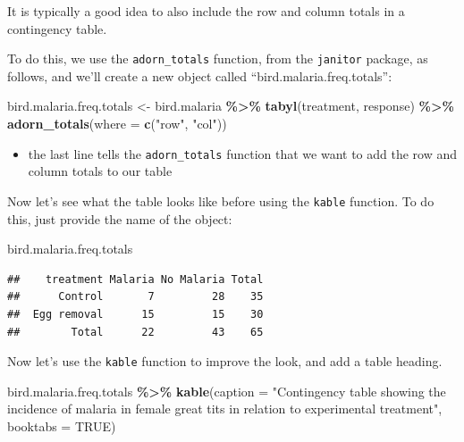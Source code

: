 \documentclass[
]{book}
\newenvironment{Shaded}{\begin{snugshade}}{\end{snugshade}}
\newcommand{\AttributeTok}[1]{\textcolor[rgb]{0.13,0.29,0.53}{#1}}
\newcommand{\ConstantTok}[1]{\textcolor[rgb]{0.56,0.35,0.01}{#1}}
\newcommand{\FunctionTok}[1]{\textcolor[rgb]{0.13,0.29,0.53}{\textbf{#1}}}
\newcommand{\NormalTok}[1]{#1}
\newcommand{\OtherTok}[1]{\textcolor[rgb]{0.56,0.35,0.01}{#1}}
\newcommand{\SpecialCharTok}[1]{\textcolor[rgb]{0.81,0.36,0.00}{\textbf{#1}}}
\newcommand{\StringTok}[1]{\textcolor[rgb]{0.31,0.60,0.02}{#1}}
\providecommand{\tightlist}{%
  \setlength{\itemsep}{0pt}\setlength{\parskip}{0pt}}
\begin{document}
It is typically a good idea to also include the row and column totals in a contingency table.

To do this, we use the \texttt{adorn\_totals} function, from the \texttt{janitor} package, as follows, and we'll create a new object called ``bird.malaria.freq.totals'':

\begin{Shaded}
\begin{Highlighting}[]
\NormalTok{bird.malaria.freq.totals }\OtherTok{\textless{}{-}}\NormalTok{ bird.malaria }\SpecialCharTok{\%\textgreater{}\%}
  \FunctionTok{tabyl}\NormalTok{(treatment, response) }\SpecialCharTok{\%\textgreater{}\%}
  \FunctionTok{adorn\_totals}\NormalTok{(}\AttributeTok{where =} \FunctionTok{c}\NormalTok{(}\StringTok{"row"}\NormalTok{, }\StringTok{"col"}\NormalTok{))}
\end{Highlighting}
\end{Shaded}

\begin{itemize}
\tightlist
\item
  the last line tells the \texttt{adorn\_totals} function that we want to add the row and column totals to our table
\end{itemize}

Now let's see what the table looks like before using the \texttt{kable} function. To do this, just provide the name of the object:

\begin{Shaded}
\begin{Highlighting}[]
\NormalTok{bird.malaria.freq.totals}
\end{Highlighting}
\end{Shaded}

\begin{verbatim}
##    treatment Malaria No Malaria Total
##      Control       7         28    35
##  Egg removal      15         15    30
##        Total      22         43    65
\end{verbatim}

Now let's use the \texttt{kable} function to improve the look, and add a table heading.

\begin{Shaded}
\begin{Highlighting}[]
\NormalTok{bird.malaria.freq.totals }\SpecialCharTok{\%\textgreater{}\%}
  \FunctionTok{kable}\NormalTok{(}\AttributeTok{caption =} \StringTok{"Contingency table showing the incidence of malaria in female great tits in relation to experimental treatment"}\NormalTok{, }\AttributeTok{booktabs =} \ConstantTok{TRUE}\NormalTok{)}
\end{Highlighting}
\end{Shaded}
\end{document}
